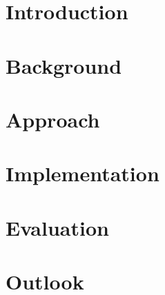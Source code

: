 \documentclass[12pt]{report}
\begin{document}
\clearpage
\tableofcontents
\clearpage

\chapter{Introduction} \label{ch:intro}

\chapter{Background} \label{ch:background}

\chapter{Approach} \label{ch:approach}

\chapter{Implementation} \label{ch:implementation}

\chapter{Evaluation} \label{ch:evaluation}

\chapter{Outlook} \label{ch:outlook}


% 



\end{document}
